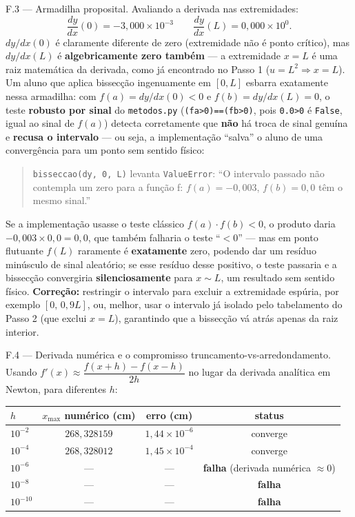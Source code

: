 \documentclass[
	12pt,				%
	openright,			%
	a4paper,			%
	english,			%
	french,				%
	spanish,			%
	brazil,				%
	]{abntex2}
\begin{document}
{F.3 --- Armadilha proposital.}
Avaliando a derivada nas extremidades:
\[
\frac{dy}{dx}(0) = -3{,}000\times10^{-3} \qquad \frac{dy}{dx}(L) = 0{,}000\times10^{0}.
\]
$dy/dx(0)$ é claramente diferente de zero (extremidade não é ponto crítico), mas $dy/dx(L)$ é \textbf{algebricamente zero também} --- a extremidade $x=L$ é uma raiz matemática da derivada, como já encontrado no Passo 1 ($u=L^2\Rightarrow x=L$). Um aluno que aplica bissecção ingenuamente em $[0,L]$ esbarra exatamente nessa armadilha: com $f(a)=dy/dx(0)<0$ e $f(b)=dy/dx(L)=0$, o teste \textbf{robusto por sinal} do \texttt{metodos.py} (\texttt{(fa>0)==(fb>0)}, pois \texttt{0.0>0} é \texttt{False}, igual ao sinal de $f(a)$) detecta corretamente que \textbf{não} há troca de sinal genuína e \textbf{recusa o intervalo} --- ou seja, a implementação ``salva'' o aluno de uma convergência para um ponto sem sentido físico:
\begin{quote}
\texttt{bisseccao(dy, 0, L)} levanta \texttt{ValueError}: ``O intervalo passado não contempla um zero para a função f: $f(a)=-0{,}003$, $f(b)=0{,}0$ têm o mesmo sinal.''
\end{quote}
Se a implementação usasse o teste clássico $f(a)\cdot f(b)<0$, o produto daria $-0{,}003\times0{,}0=0{,}0$, que também falharia o teste ``$<0$'' --- mas em ponto flutuante $f(L)$ raramente é \textbf{exatamente} zero, podendo dar um resíduo minúsculo de sinal aleatório; se esse resíduo desse positivo, o teste passaria e a bissecção convergiria \textbf{silenciosamente} para $x\sim L$, um resultado sem sentido físico. \textbf{Correção:} restringir o intervalo para excluir a extremidade espúria, por exemplo $[0,\,0{,}9L]$, ou, melhor, usar o intervalo já isolado pelo tabelamento do Passo 2 (que exclui $x=L$), garantindo que a bissecção vá atrás apenas da raiz interior.

{F.4 --- Derivada numérica e o compromisso truncamento-vs-arredondamento.}
Usando $f'(x) \approx \dfrac{f(x+h)-f(x-h)}{2h}$ no lugar da derivada analítica em Newton, para diferentes $h$:

\begin{center}
\begin{tabular}{lccc}
\hline
$h$ & $x_{\text{max}}$ numérico (cm) & erro (cm) & status \\ \hline
$10^{-2}$ & $268{,}328159$ & $1{,}44\times10^{-6}$ & converge \\
$10^{-4}$ & $268{,}328012$ & $1{,}45\times10^{-4}$ & converge \\
$10^{-6}$ & --- & --- & \textbf{falha} (derivada numérica $\approx 0$) \\
$10^{-8}$ & --- & --- & \textbf{falha} \\
$10^{-10}$ & --- & --- & \textbf{falha} \\ \hline
\end{tabular}
\end{center}
\end{document}
